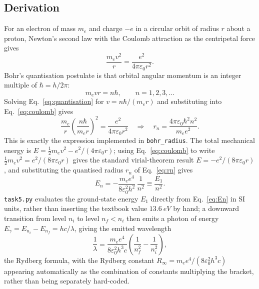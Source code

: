 \documentclass[11pt]{article}
\begin{document}
\subsection{Derivation}
For an electron of mass $m_e$ and charge $-e$ in a circular orbit of radius $r$ about a proton, Newton's second law with the Coulomb attraction as the centripetal force gives
\begin{equation}
\frac{m_e v^2}{r} = \frac{e^2}{4\pi\varepsilon_0 r^2}. \label{eq:coulomb}
\end{equation}
Bohr's quantisation postulate is that orbital angular momentum is an integer multiple of $\hbar=h/2\pi$:
\begin{equation}
m_e v r = n\hbar, \qquad n=1,2,3,\ldots \label{eq:quantisation}
\end{equation}
Solving Eq.~\eqref{eq:quantisation} for $v=n\hbar/(m_e r)$ and substituting into Eq.~\eqref{eq:coulomb} gives
\begin{equation}
\frac{m_e}{r}\left(\frac{n\hbar}{m_e r}\right)^2 = \frac{e^2}{4\pi\varepsilon_0 r^2}
\quad\Longrightarrow\quad
r_n = \frac{4\pi\varepsilon_0\hbar^2 n^2}{m_e e^2}. \label{eq:rn}
\end{equation}
This is exactly the expression implemented in \texttt{bohr\_radius}. The total mechanical energy is $E=\tfrac12 m_ev^2 - e^2/(4\pi\varepsilon_0 r)$; using Eq.~\eqref{eq:coulomb} to write $\tfrac12 m_ev^2 = e^2/(8\pi\varepsilon_0 r)$ gives the standard virial-theorem result $E=-e^2/(8\pi\varepsilon_0 r)$, and substituting the quantised radius $r_n$ of Eq.~\eqref{eq:rn} gives
\begin{equation}
E_n = -\frac{m_e e^4}{8\varepsilon_0^2 h^2}\,\frac{1}{n^2} \equiv \frac{E_1}{n^2}. \label{eq:En}
\end{equation}
\texttt{task5.py} evaluates the ground-state energy $E_1$ directly from Eq.~\eqref{eq:En} in SI units, rather than inserting the textbook value $\SI{13.6}{eV}$ by hand; a downward transition from level $n_i$ to level $n_f<n_i$ then emits a photon of energy $E_\gamma = E_{n_i}-E_{n_f} = h c/\lambda$, giving the emitted wavelength
\begin{equation}
\frac{1}{\lambda} = \frac{m_ee^4}{8\varepsilon_0^2h^3c}\left(\frac{1}{n_f^2}-\frac{1}{n_i^2}\right),
\end{equation}
the Rydberg formula, with the Rydberg constant $R_\infty = m_ee^4/(8\varepsilon_0^2h^3c)$ appearing automatically as the combination of constants multiplying the bracket, rather than being separately hard-coded.
\end{document}
